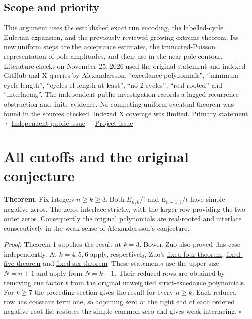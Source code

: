 \documentclass[11pt]{article}
\begin{document}
\subsection{Scope and priority}

This argument uses the established exact run encoding, the labelled-cycle Eulerian expansion, and the previously reviewed growing-extreme theorem. Its new uniform steps are the acceptance estimates, the truncated-Poisson representation of pole amplitudes, and their use in the near-pole contour. Literature checks on November 25, 2026 used the original statement and indexed GitHub and X queries by Alexandersson, “excedance polynomials”, “minimum cycle length”, “cycles of length at least”, “no 2-cycles”, “real-rooted” and “interlacing”. The independent public investigation records a lagged recurrence obstruction and finite evidence. No competing uniform eventual theorem was found in the sources checked. Indexed X coverage was limited. \href{https://www.symmetricfunctions.com/realRootedOpenProblems.htm\#conjLongCycleExcedances}{Primary statement} · \href{https://github.com/1337isnot1337/solved-conjectures/issues/81}{Independent public issue} · \href{https://github.com/ProgramComputer/open-math-research/issues/4}{Project issue}







\clearpage



\section{All cutoffs and the original conjecture}

\textbf{Theorem.} Fix integers $n\ge k\ge3$. Both $E_{n,k}/t$ and
$E_{n+1,k}/t$ have simple negative zeros. The zeros interlace strictly,
with the larger row providing the two outer zeros. Consequently the
original polynomials are real-rooted and interlace consecutively in the
weak sense of Alexandersson's conjecture.

\emph{Proof.} Theorem 1 supplies the result at $k=3$. Bowen Zuo also
proved this case independently. At $k=4,5,6$ apply, respectively, Zuo's
\href{https://github.com/AlexZander-666/long-cycle-excedance-interlacing/releases/tag/v1.0.0}{fixed-four theorem},
\href{https://github.com/AlexZander-666/long-cycle-excedance-interlacing/releases/tag/v1.1.0}{fixed-five theorem}
and \href{https://github.com/AlexZander-666/long-cycle-excedance-interlacing/releases/tag/v1.2.0}{fixed-six theorem}.
These statements use the upper size $N=n+1$ and apply from
$N=k+1$. Their reduced rows are obtained by removing one factor $t$
from the original unweighted strict-excedance polynomials.
For $k\ge7$ the preceding section gives the result for every $n\ge k$.
Each reduced row has constant term one, so adjoining zero at the right
end of each ordered negative-root list restores the simple common zero
and gives weak interlacing. \hfill$\square$
\end{document}
